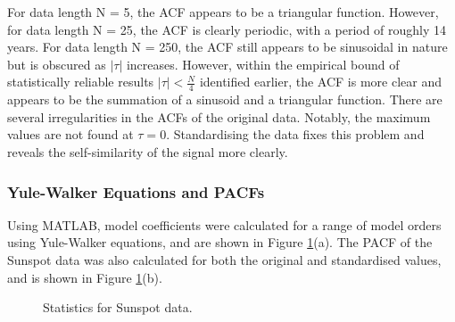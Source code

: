 \noindent
For data length N = 5, the ACF appears to be a triangular function. However, for data length N = 25, the ACF is clearly periodic, with a period of roughly 14 years. For data length N = 250, the ACF still appears to be sinusoidal in nature but is obscured as $|\tau|$ increases. However, within the empirical bound of statistically reliable results $|\tau|<\frac{N}{4}$ identified earlier, the ACF is more clear and appears to be the summation of a sinusoid and a triangular function. There are several irregularities in the ACFs of the original data. Notably, the maximum values are not found at $\tau = 0$. Standardising the data fixes this problem and reveals the self-similarity of the signal more clearly.

\subsubsection{Yule-Walker Equations and PACFs}

Using MATLAB, model coefficients were calculated for a range of model orders using Yule-Walker equations, and are shown in Figure \ref{fig:yulewalker}(a). The PACF of the Sunspot data was also calculated for both the original and standardised values, and is shown in Figure \ref{fig:yulewalker}(b).

\begin{figure}[H]
    \centering
    \caption{Statistics for Sunspot data.}
    \label{fig:yulewalker}
\end{figure}

